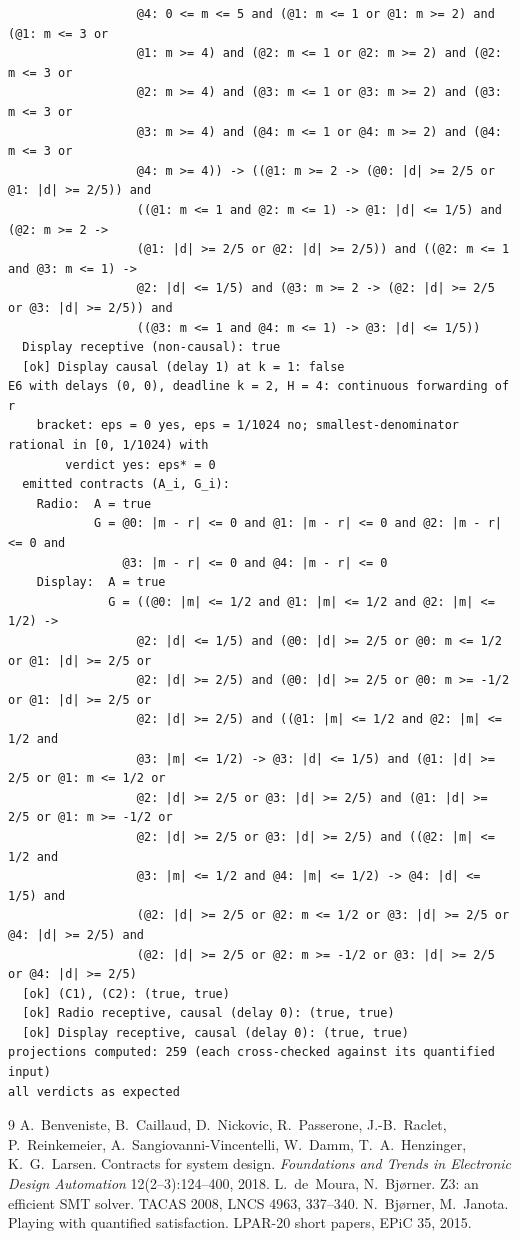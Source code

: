 \documentclass[11pt]{article}
\theoremstyle{definition}
\theoremstyle{remark}
\begin{document}
{\begin{verbatim}
                  @4: 0 <= m <= 5 and (@1: m <= 1 or @1: m >= 2) and (@1: m <= 3 or
                  @1: m >= 4) and (@2: m <= 1 or @2: m >= 2) and (@2: m <= 3 or
                  @2: m >= 4) and (@3: m <= 1 or @3: m >= 2) and (@3: m <= 3 or
                  @3: m >= 4) and (@4: m <= 1 or @4: m >= 2) and (@4: m <= 3 or
                  @4: m >= 4)) -> ((@1: m >= 2 -> (@0: |d| >= 2/5 or @1: |d| >= 2/5)) and
                  ((@1: m <= 1 and @2: m <= 1) -> @1: |d| <= 1/5) and (@2: m >= 2 ->
                  (@1: |d| >= 2/5 or @2: |d| >= 2/5)) and ((@2: m <= 1 and @3: m <= 1) ->
                  @2: |d| <= 1/5) and (@3: m >= 2 -> (@2: |d| >= 2/5 or @3: |d| >= 2/5)) and
                  ((@3: m <= 1 and @4: m <= 1) -> @3: |d| <= 1/5))
  Display receptive (non-causal): true
  [ok] Display causal (delay 1) at k = 1: false
E6 with delays (0, 0), deadline k = 2, H = 4: continuous forwarding of r
    bracket: eps = 0 yes, eps = 1/1024 no; smallest-denominator rational in [0, 1/1024) with
        verdict yes: eps* = 0
  emitted contracts (A_i, G_i):
    Radio:  A = true
            G = @0: |m - r| <= 0 and @1: |m - r| <= 0 and @2: |m - r| <= 0 and
                @3: |m - r| <= 0 and @4: |m - r| <= 0
    Display:  A = true
              G = ((@0: |m| <= 1/2 and @1: |m| <= 1/2 and @2: |m| <= 1/2) ->
                  @2: |d| <= 1/5) and (@0: |d| >= 2/5 or @0: m <= 1/2 or @1: |d| >= 2/5 or
                  @2: |d| >= 2/5) and (@0: |d| >= 2/5 or @0: m >= -1/2 or @1: |d| >= 2/5 or
                  @2: |d| >= 2/5) and ((@1: |m| <= 1/2 and @2: |m| <= 1/2 and
                  @3: |m| <= 1/2) -> @3: |d| <= 1/5) and (@1: |d| >= 2/5 or @1: m <= 1/2 or
                  @2: |d| >= 2/5 or @3: |d| >= 2/5) and (@1: |d| >= 2/5 or @1: m >= -1/2 or
                  @2: |d| >= 2/5 or @3: |d| >= 2/5) and ((@2: |m| <= 1/2 and
                  @3: |m| <= 1/2 and @4: |m| <= 1/2) -> @4: |d| <= 1/5) and
                  (@2: |d| >= 2/5 or @2: m <= 1/2 or @3: |d| >= 2/5 or @4: |d| >= 2/5) and
                  (@2: |d| >= 2/5 or @2: m >= -1/2 or @3: |d| >= 2/5 or @4: |d| >= 2/5)
  [ok] (C1), (C2): (true, true)
  [ok] Radio receptive, causal (delay 0): (true, true)
  [ok] Display receptive, causal (delay 0): (true, true)
projections computed: 259 (each cross-checked against its quantified input)
all verdicts as expected
\end{verbatim}
}

{\small\begin{thebibliography}{9}
 A.~Benveniste, B.~Caillaud, D.~Nickovic, R.~Passerone, J.-B.~Raclet, P.~Reinkemeier, A.~Sangiovanni-Vincentelli, W.~Damm, T.~A.~Henzinger, K.~G.~Larsen.
Contracts for system design. \emph{Foundations and Trends in Electronic Design Automation} 12(2--3):124--400, 2018.
 L.~de~Moura, N.~Bj{\o}rner. Z3: an efficient SMT solver. TACAS 2008, LNCS 4963, 337--340.
 N.~Bj{\o}rner, M.~Janota. Playing with quantified satisfaction. LPAR-20 short papers, EPiC 35, 2015.
\end{thebibliography}}
\end{document}
